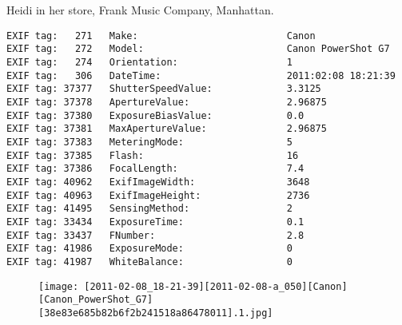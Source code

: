 \section{\protect{}}
\noindent Heidi in her store, Frank Music Company, Manhattan.
\noindent
\begin{lstlisting}
EXIF tag:   271   Make:                          Canon
EXIF tag:   272   Model:                         Canon PowerShot G7
EXIF tag:   274   Orientation:                   1
EXIF tag:   306   DateTime:                      2011:02:08 18:21:39
EXIF tag: 37377   ShutterSpeedValue:             3.3125
EXIF tag: 37378   ApertureValue:                 2.96875
EXIF tag: 37380   ExposureBiasValue:             0.0
EXIF tag: 37381   MaxApertureValue:              2.96875
EXIF tag: 37383   MeteringMode:                  5
EXIF tag: 37385   Flash:                         16
EXIF tag: 37386   FocalLength:                   7.4
EXIF tag: 40962   ExifImageWidth:                3648
EXIF tag: 40963   ExifImageHeight:               2736
EXIF tag: 41495   SensingMethod:                 2
EXIF tag: 33434   ExposureTime:                  0.1
EXIF tag: 33437   FNumber:                       2.8
EXIF tag: 41986   ExposureMode:                  0
EXIF tag: 41987   WhiteBalance:                  0

\end{lstlisting}
\clearpage
\begin{figure}
\raggedleft
\texttt{[image: [2011-02-08\_18-21-39][2011-02-08-a\_050][Canon][Canon\_PowerShot\_G7][38e83e685b82b6f2b241518a86478011].1.jpg]}
\end{figure}


\clearpage

